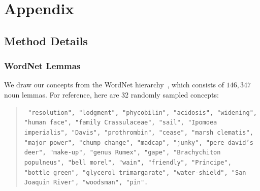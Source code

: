 \chapter{Appendix}





\section{Method Details}


\subsection{WordNet Lemmas}
\label{sec:wordnet_lemmas}
We draw our concepts from the WordNet hierarchy~\cite{miller1995wordnet}, which consists of $146{,}347$ noun lemmas. For reference, here are 32 randomly sampled concepts:
\begin{quote}
{\tt { 
"resolution",
"lodgment",
"phycobilin",
"acidosis",
"widening",
"human face",
"family Crassulaceae",
"sail",
"Ipomoea imperialis",
"Davis",
"prothrombin",
"cease",
"marsh clematis",
"major power",
"chump change",
"madcap",
"junky",
"pere david's deer",
"make-up",
"genus Rumex",
"gape",
"Brachychiton populneus",
"bell morel",
"wain",
"friendly",
"Principe",
"bottle green",
"glycerol trimargarate",
"water-shield",
"San Joaquin River",
"woodsman",
"pin".
}}
\end{quote}

